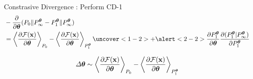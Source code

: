 	\begin{frame}[t]{Constrasive Divergence}
	:
	 Perform CD-1
	    \begin{align}
	    &-\dfrac{\partial}{\partial \btheta} (P_0\|P_{\infty}^{\btheta} - P_{1}^{\btheta}\|P_{\infty}^{\btheta})\nonumber\\\vspace{3mm}
	    &=\left\langle \frac{\partial \mathcal{F}(\x)}{\partial \boldsymbol{\theta}}\right\rangle_{P_0} 
		  -\left\langle \frac{\partial \mathcal{F}(\x)}{\partial \boldsymbol{\theta}}\right\rangle_{P_{1}^{\btheta}}\nonumber
		  \uncover<1-2>{+ \alert<2-2>{\frac{\partial P_{1}^{\btheta}}{\partial \btheta} \frac{\partial (P_{1}^{\btheta}|P_{\infty}^{\btheta})}{\partial P_{1}^{\btheta}}\nonumber}}
	    \end{align}
	    
	 {
	 \begin{align}
	  \Delta \boldsymbol{\theta} \sim \left\langle \frac{\partial \mathcal{F}(\mathbf{x})}{\partial \boldsymbol{\theta}}\right\rangle_{P_0} 
		  -\left\langle \frac{\partial \mathcal{F}(\mathbf{x})}{\partial \boldsymbol{\theta}}\right\rangle_{P_{1}^{\boldsymbol{\theta}}}\nonumber
	 \end{align}
	}
	\end{frame}





